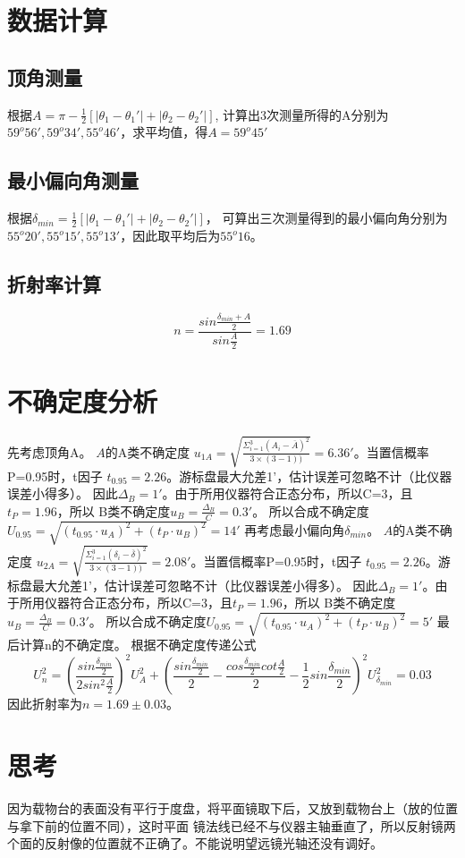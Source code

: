 \documentclass[UTF8]{ctexart}
\begin{document}
\section{数据计算}
\subsection{顶角测量}
根据$A=\pi-\frac{1}{2}\left[ | \theta_1-\theta_1'| +| \theta_2-\theta_2'|  \right]$,
计算出3次测量所得的A分别为$59^o56',59^o34',55^o46'$，求平均值，得$A=59^o45'$
\subsection{最小偏向角测量}
根据$\delta_{min}=\frac{1}{2}\left[ | \theta_1-\theta_1'| +| \theta_2-\theta_2'|  \right]$，
可算出三次测量得到的最小偏向角分别为$55^o20',55^o15',55^o13'$，因此取平均后为$55^o16$。
\subsection{折射率计算}
\[n=\frac{sin\frac{\delta_{min}+A}{2}}{sin \frac{A}{2}}=1.69\]
\section{不确定度分析}
先考虑顶角A。
$A$的A类不确定度
$u_{1A}=\sqrt{\frac{\Sigma_{i=1}^3(A_i-\overline{A})^2}{3\times \left( 3-1 \right))}}=6.36'$。当置信概率P=0.95时，t因子
$t_{0.95}=2.26$。游标盘最大允差1'，估计误差可忽略不计（比仪器误差小得多）。
因此$\Delta_B=1'$。由于所用仪器符合正态分布，所以C=3，且$t_P=1.96$，所以
B类不确定度$u_B=\frac{\Delta_B}{C}=0.3'$。
所以合成不确定度$U_{0.95}=\sqrt{\left( t_{0.95}\cdot u_A \right)^2+\left( t_P\cdot u_B \right)^2}=14'$
\newline
再考虑最小偏向角$\delta_{min}$。
$A$的A类不确定度
$u_{2A}=\sqrt{\frac{\Sigma_{i=1}^3(\delta_i-\overline{\delta})^2}{3\times \left( 3-1 \right))}}=2.08'$。当置信概率P=0.95时，t因子
$t_{0.95}=2.26$。游标盘最大允差1'，估计误差可忽略不计（比仪器误差小得多）。
因此$\Delta_B=1'$。由于所用仪器符合正态分布，所以C=3，且$t_P=1.96$，所以
B类不确定度$u_B=\frac{\Delta_B}{C}=0.3'$。
所以合成不确定度$U_{0.95}=\sqrt{\left( t_{0.95}\cdot u_A \right)^2+\left( t_P\cdot u_B \right)^2}=5'$
\newline
最后计算n的不确定度。
根据不确定度传递公式
\[U_n^2=(\frac{sin\frac{\delta_{min}}{2}}{2sin^2\frac{A}{2}})^2U_A^2+(\frac{sin\frac{\delta_{min}}{2}}{2}-\frac{cos\frac{\delta_{min}}{2}cot\frac{A}{2}}{2}-\frac{1}{2}sin\frac{\delta_{min}}{2})^2U_{\delta_{min}}^2=0.03\]
因此折射率为$n=1.69\pm 0.03$。
\section{思考}
因为载物台的表面没有平行于度盘，将平面镜取下后，又放到载物台上（放的位置与拿下前的位置不同），这时平面
镜法线已经不与仪器主轴垂直了，所以反射镜两个面的反射像的位置就不正确了。不能说明望远镜光轴还没有调好。
\end{document}

